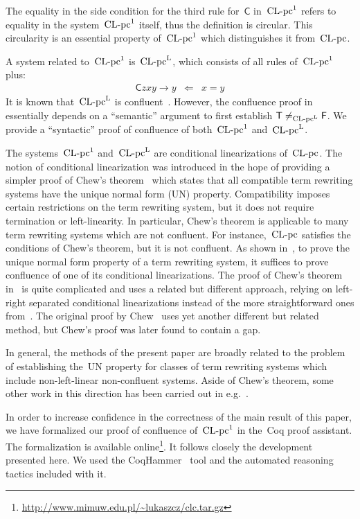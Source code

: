 \documentclass[a4paper,UKenglish]{lipics-v2016}
\newcommand{\Cs}{\mathsf{C}}
\newcommand{\Fs}{\mathsf{F}}
\newcommand{\Ts}{\mathsf{T}}
\newcommand{\From}{\ensuremath{\Leftarrow}}
\newcommand{\CLC}{{\mbox{${\text{\rm CL-pc}^1}$}}}
\newcommand{\CLCz}{{\mbox{$\text{\rm CL-pc}$}}}
\newcommand{\CLCp}{{\mbox{$\text{\rm CL-pc}^{\mathrm{L}}$}}}
\newcommand{\sCLCp}{\ensuremath{\text{\rm CL-pc}^{\mathrm{L}}}}
\begin{document}
The equality in the side condition for the third rule for~$\Cs$
in~$\CLC$ refers to equality in the system~$\CLC$ itself, thus the
definition is circular. This circularity is an essential property
of~$\CLC$ which distinguishes it from~$\CLCz$.

A system related to~$\CLC$ is~$\CLCp$, which consists of all rules
of~$\CLC$ plus:
\begin{eqnarray*}
  \Cs z x y \to y &\From& x = y
\end{eqnarray*}
It is known that~$\CLCp$ is confluent~\cite{Vrijer1999}. However, the
confluence proof in~\cite{Vrijer1999} essentially depends on a
``semantic'' argument to first establish $\Ts \ne_{\sCLCp} \Fs$. We
provide a ``syntactic'' proof of confluence of both~$\CLC$
and~$\CLCp$.

The systems~$\CLC$ and~$\CLCp$ are conditional linearizations
of~$\CLCz$. The notion of conditional linearization was introduced in
the hope of providing a simpler proof of Chew's
theorem~\cite{Chew1981,ManoOgawa2001} which states that all compatible
term rewriting systems have the unique normal form (UN)
property. Compatibility imposes certain restrictions on the term
rewriting system, but it does not require termination or
left-linearity. In particular, Chew's theorem is applicable to many
term rewriting systems which are not confluent. For instance,~$\CLCz$
satisfies the conditions of Chew's theorem, but it is not
confluent. As shown in~\cite{Vrijer1999}, to prove the unique normal
form property of a term rewriting system, it suffices to prove
confluence of one of its conditional linearizations. The proof of
Chew's theorem in~\cite{ManoOgawa2001} is quite complicated and uses a
related but different approach, relying on left-right separated
conditional linearizations instead of the more straightforward ones
from~\cite{Vrijer1999}. The original proof by Chew~\cite{Chew1981}
uses yet another different but related method, but Chew's proof was
later found to contain a gap.

In general, the methods of the present paper are broadly related to
the problem of establishing the~UN property for classes of term
rewriting systems which include non-left-linear non-confluent
systems. Aside of Chew's theorem, some other work in this direction
has been carried out in
e.g.~\cite{KlopVrijer1989,ToyamaOyamaguchi1995,Verma1997,Stovring2006,KahrsSmith2016}.

In order to increase confidence in the correctness of the main result
of this paper, we have formalized our proof of confluence of~$\CLC$ in
the~Coq proof assistant. The formalization is available
online\footnote{\url{http://www.mimuw.edu.pl/~lukaszcz/clc.tar.gz}}. It
follows closely the development presented here. We used the
CoqHammer~\cite{CzajkaKaliszyk2017Submitted} tool and the automated
reasoning tactics included with it.
\end{document}
